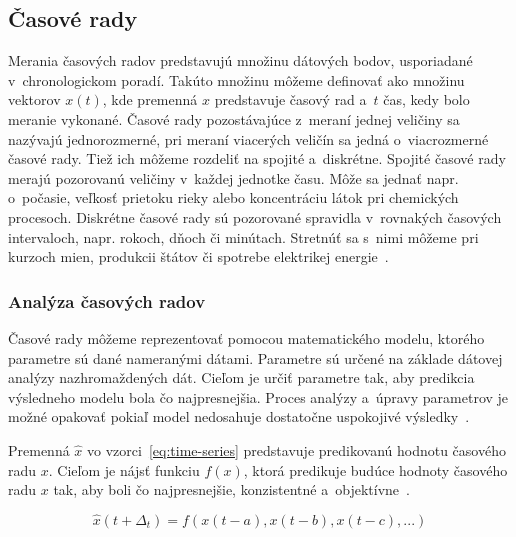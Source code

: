 \documentclass[a4paper,twoside,slovak,12pt,appendix]{article}
\begin{document}

\subsection{Časové rady}
Merania časových radov predstavujú množinu dátových bodov, usporiadané
v~chronologickom poradí. Takúto množinu môžeme definovať ako množinu vektorov
$x(t)$, kde premenná $x$ predstavuje časový rad a~$t$ čas, kedy bolo meranie
vykonané. Časové rady pozostávajúce z~meraní jednej veličiny sa nazývajú
jednorozmerné, pri meraní viacerých veličín sa jedná o~viacrozmerné časové rady.
Tiež ich môžeme rozdeliť na spojité a~diskrétne. Spojité časové rady merajú
pozorovanú veličiny v~každej jednotke času. Môže sa jednať napr. o~počasie,
veľkosť prietoku rieky alebo koncentráciu látok pri chemických procesoch.
Diskrétne časové rady sú pozorované spravidla v~rovnakých časových intervaloch,
napr. rokoch, dňoch či minútach. Stretnúť sa s~nimi môžeme pri kurzoch mien,
produkcii štátov či spotrebe elektrikej energie~\cite{Agrawal2013}.


\subsubsection{Analýza časových radov}
Časové rady môžeme reprezentovať pomocou matematického modelu, ktorého parametre
sú dané nameranými dátami. Parametre sú určené na základe dátovej analýzy
nazhromaždených dát. Cieľom je určiť parametre tak, aby predikcia výsledneho
modelu bola čo najpresnejšia. Proces analýzy a~úpravy parametrov je možné
opakovať pokiaľ model nedosahuje dostatočne uspokojivé
výsledky~\cite{Agrawal2013}.

Premenná $\hat{x}$ vo vzorci~\ref{eq:time-series} predstavuje predikovanú
hodnotu časového radu $x$. Cieľom je nájsť funkciu $f(x)$, ktorá predikuje
budúce hodnoty časového radu $x$ tak, aby boli čo najpresnejšie, konzistentné
a~objektívne~\cite{Sapankevych2009}.

\begin{equation}
  \hat{x}(t+\Delta_t) = f(x(t-a), x(t-b), x(t-c), ...)
  \label{eq:time-series}
\end{equation}
\end{document}
